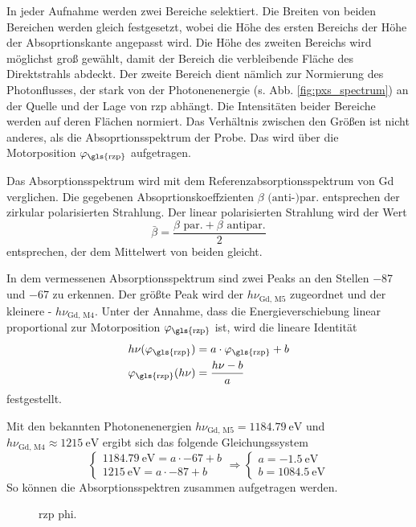 \noindent
In jeder Aufnahme werden zwei Bereiche selektiert. Die Breiten von beiden Bereichen werden gleich festgesetzt, wobei die Höhe des ersten Bereichs der Höhe der Absoprtionskante angepasst wird. Die Höhe des zweiten Bereichs wird möglichst groß gewählt, damit der Bereich die verbleibende Fläche des Direktstrahls abdeckt. Der zweite Bereich dient nämlich zur Normierung des Photonflusses, der stark von der Photonenenergie (s. Abb. \ref{fig:pxs_spectrum}) an der Quelle und der Lage von \gls{rzp} abhängt. Die Intensitäten beider Bereiche werden auf deren Flächen normiert. Das Verhältnis zwischen den Größen ist nicht anderes, als die Absoprtionsspektrum der Probe. Das wird über die Motorposition $\varphi_\text{\gls{rzp}}$ aufgetragen.

\noindent
Das Absorptionsspektrum wird mit dem Referenzabsorptionsspektrum von Gd verglichen. Die gegebenen \cite[Abb. 2]{prieto-x-ray-2005} Absoprtionskoeffzienten $\beta \text{ (anti-)par.}$ entsprechen der zirkular polarisierten Strahlung. Der linear polarisierten Strahlung wird der Wert 
\begin{equation}
    \bar{\beta} = \frac{\beta \text{ par.} + \beta \text{ antipar.}}{2}
\end{equation}
entsprechen, der dem Mittelwert von beiden gleicht.

\noindent
In dem vermessenen Absorptionsspektrum sind zwei Peaks an den Stellen \num{-87} und \num{-67} zu erkennen. Der größte Peak wird der $h\nu_\text{Gd, M5}$ zugeordnet und der kleinere - $h\nu_\text{Gd, M4}$. Unter der Annahme, dass die Energieverschiebung linear proportional zur Motorposition $\varphi_\text{\gls{rzp}}$ ist, wird die lineare Identität
\begin{equation}
    \begin{split}
        h\nu(\varphi_\text{\gls{rzp}}) &= a\cdot \varphi_\text{\gls{rzp}} + b\\
        \varphi_\text{\gls{rzp}}(h\nu) &= \frac{h\nu - b}{a}
    \end{split}
\end{equation}
festgestellt.

\noindent
Mit den bekannten Photonenenergien $h\nu_\text{Gd, M5} = \SI{1184,79}{\eV}$ und $h\nu_\text{Gd, M4} \approx \SI{1215}{\eV}$ ergibt sich das folgende Gleichungssystem
\begin{equation}
    \begin{cases}
    \SI{1184,79}{\eV} = a\cdot \num{-67} + b\\
    \SI{1215}{\eV} = a\cdot \num{-87} + b
    \end{cases}
    \Rightarrow
    \begin{cases}
    a = \SI{-1,5}{\eV}\\
    b = \SI{1084,5}{\eV}
    \end{cases}
    \label{eq:rzp_phi_to_ev}
\end{equation}
\noindent
So können die Absorptionsspektren zusammen aufgetragen werden.
\begin{figure}[H]
    \centering
    
    \caption{rzp phi.}
    \label{fig:rzp_phi_ev}
\end{figure}






